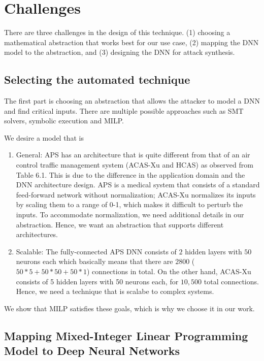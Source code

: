 \section{Challenges}
There are three challenges in the design of this technique. 
(1) choosing a mathematical abstraction that works best for our use case, 
(2) mapping the \ac{DNN}  model to the abstraction, and 
(3) designing the \ac{DNN}  for attack synthesis.  


\subsection{Selecting  the automated technique}
The first part is choosing an abstraction that allows the attacker to model a DNN and find critical inputs. 
There are multiple possible approaches such as SMT  solvers, symbolic execution and MILP.

We desire a model that is
\begin{enumerate}
	\item General: \ac{APS} has an architecture that %
	is quite different from that of an air control traffic management system (\ac{ACAS-Xu} and \ac{HCAS}) as observed from Table 6.1.
	This is due to the difference in the application domain and the \ac{DNN} architecture design. 
	\ac{APS} is a medical system that consists of a standard feed-forward network without normalization; \ac{ACAS-Xu} normalizes its inputs by scaling them to a range of {0-1}, which makes it difficult to perturb the inputs. 
	To accommodate normalization, we need additional details in our abstraction.  
	Hence, we want an abstraction that supports different architectures. 
	\item Scalable: The fully-connected \ac{APS} \ac{DNN} consists of $2$ hidden layers with $50$ neurons each which basically means that there are $2800$ ($50*5 + 50*50 + 50*1$) connections in total.
	On the other hand, \ac{ACAS-Xu} consists of 5 hidden layers with 50 neurons each, for $10,500$ total connections. 
	Hence, we need a technique that is scalabe to complex systems. 
	
\end{enumerate}

 We show that \ac{MILP} satisfies these goals, which is why we choose it in our work. %


\subsection{ Mapping  Mixed-Integer Linear Programming Model to Deep Neural Networks}

